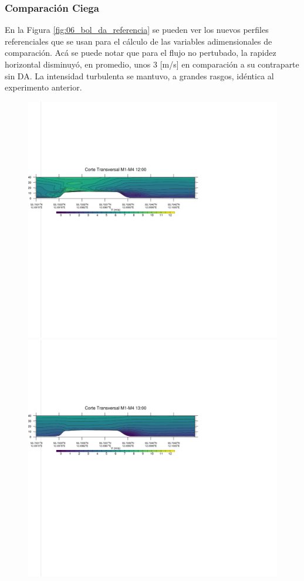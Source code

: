 \subsubsection{Comparación Ciega}
En la Figura \ref{fig:06_bol_da_referencia} se pueden ver los nuevos perfiles referenciales que se usan para el cálculo de las variables adimensionales de comparación. Acá se puede notar que para el flujo no pertubado, la rapidez horizontal disminuyó, en promedio, unos 3 [m/s] en comparación a su contraparte sin DA. La intensidad turbulenta se mantuvo, a grandes rasgos, idéntica al experimento anterior.
\newpage
\vspace*{\fill}
\begin{figure}[H]
	\centering
	\includegraphics[width=0.90\linewidth,trim={0mm 202.0mm 111mm 106mm},clip]{Imagenes/06/bol_da/1200rot}\\%
	\includegraphics[width=0.90\linewidth,trim={0mm 202.0mm 111mm 106mm},clip]{Imagenes/06/bol_da/1300rot}\\%

\end{figure}
